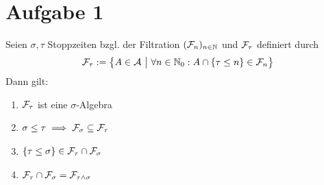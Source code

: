\documentclass[12pt,a4paper]{article}
\author{Willi Sontopski}
\begin{document}

\section*{Aufgabe 1}
Seien $\sigma,\tau$ Stoppzeiten bzgl. der Filtration $(\mathcal{F}_n)_{n\in\mathbb{N}}$ und $\mathcal{F}_\tau$ definiert durch
\begin{align*}
\mathcal{F}_\tau:=\big\lbrace A\in\mathcal{A}~\big|~\forall n\in\mathbb{N}_0:A\cap\lbrace\tau\leq n\rbrace\in\mathcal{F}_n\big\rbrace
\end{align*}
Dann gilt:
\begin{enumerate}[label=\alph*)]
\item $\mathcal{F}_\tau$ ist eine $\sigma$-Algebra
\item $\begin{aligned}
\sigma\leq\tau\implies\mathcal{F}_\sigma\subseteq\mathcal{F}_\tau
\end{aligned}$
\item $\begin{aligned}
\lbrace\tau\leq\sigma\rbrace\in\mathcal{F}_\tau\cap\mathcal{F}_\sigma
\end{aligned}$
\item $\begin{aligned}
\mathcal{F}_\tau\cap\mathcal{F}_\sigma=\mathcal{F}_{\tau\wedge\sigma}
\end{aligned}$
\end{enumerate}
\end{document}
